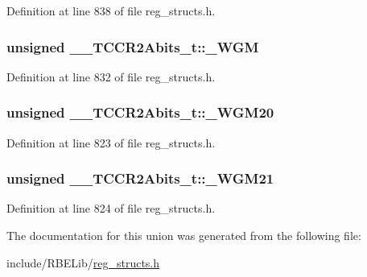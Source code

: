Definition at line 838 of file reg\+\_\+structs.\+h.

\hypertarget{union_____t_c_c_r2_abits__t_af1852fd2a4db292d8eca8eaf7351b79b}{
\subsubsection[{\+\_\+\+W\+G\+M}]{\setlength{\rightskip}{0pt plus 5cm}unsigned \+\_\+\+\_\+\+T\+C\+C\+R2\+Abits\+\_\+t\+::\+\_\+\+W\+G\+M}}\label{union_____t_c_c_r2_abits__t_af1852fd2a4db292d8eca8eaf7351b79b}


Definition at line 832 of file reg\+\_\+structs.\+h.

\hypertarget{union_____t_c_c_r2_abits__t_ad4d45207e6874e64535216c7a9fcb48d}{
\subsubsection[{\+\_\+\+W\+G\+M20}]{\setlength{\rightskip}{0pt plus 5cm}unsigned \+\_\+\+\_\+\+T\+C\+C\+R2\+Abits\+\_\+t\+::\+\_\+\+W\+G\+M20}}\label{union_____t_c_c_r2_abits__t_ad4d45207e6874e64535216c7a9fcb48d}


Definition at line 823 of file reg\+\_\+structs.\+h.

\hypertarget{union_____t_c_c_r2_abits__t_a4933d1927e310fddcaea049b436fe836}{
\subsubsection[{\+\_\+\+W\+G\+M21}]{\setlength{\rightskip}{0pt plus 5cm}unsigned \+\_\+\+\_\+\+T\+C\+C\+R2\+Abits\+\_\+t\+::\+\_\+\+W\+G\+M21}}\label{union_____t_c_c_r2_abits__t_a4933d1927e310fddcaea049b436fe836}


Definition at line 824 of file reg\+\_\+structs.\+h.



The documentation for this union was generated from the following file\+:\begin{DoxyCompactItemize}
\item 
include/\+R\+B\+E\+Lib/\hyperlink{reg__structs_8h}{reg\+\_\+structs.\+h}\end{DoxyCompactItemize}
